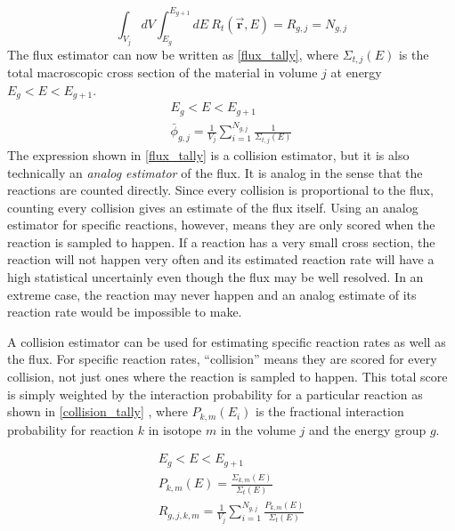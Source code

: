 %
\begin{equation}
\label{RR_coll}
\int_{V_j} dV \int_{E_g}^{E_{g+1}} dE \: R_t(\boldsymbol{\vec{r}},E) = R_{g,j} = N_{g,j}
\end{equation}
%
The flux estimator can now be written as \eqref{flux_tally}, where $\Sigma_{t,j}(E)$ is the total macroscopic cross section  of the material in volume $j$ at energy $E_g < E < E_{g+1}$.
%
\begin{equation}
\label{flux_tally}
\begin{gathered}
E_g < E < E_{g+1} \\
\bar{\phi}_{g,j} =  \frac{1}{V_j} \sum_{i=1}^{N_{g,j}} \frac{1}{\Sigma_{t,j}(E)} 
\end{gathered}
\end{equation}
%
The expression shown in \eqref{flux_tally} is a collision estimator, but it is also technically an \emph{analog estimator} of the flux.  It is analog in the sense that the reactions are counted directly.  Since every collision is proportional to the flux, counting every collision gives an estimate of the flux itself.  Using an analog estimator for specific reactions, however, means they are only scored when the reaction is sampled to happen.  If a reaction has a very small cross section, the reaction will not happen very often and its estimated reaction rate will have a high statistical uncertainly even though the flux may be well resolved.  In an extreme case, the reaction may never happen and an analog estimate of its reaction rate would be impossible to make.  

A collision estimator can be used for estimating specific reaction rates as well as the flux.  For specific reaction rates, ``collision'' means they are scored for every collision, not just ones where the reaction is sampled to happen.  This total score is simply weighted by the interaction probability for a particular reaction as shown in \eqref{collision_tally} \cite{jaakko}, where $P_{k,m}(E_i)$ is the fractional interaction probability for reaction $k$ in isotope $m$ in the volume $j$ and the energy group $g$.

\begin{equation}
\label{collision_tally}
\begin{gathered}
E_g < E < E_{g+1} \\
P_{k,m}(E)= \frac{\Sigma_{k,m}(E)}{\Sigma_t(E)} \\
R_{g,j,k,m} =  \frac{1}{V_j} \sum_{i=1}^{N_{g,j}} \frac{P_{k,m}(E)}{\Sigma_t(E)}
\end{gathered}
\end{equation}

